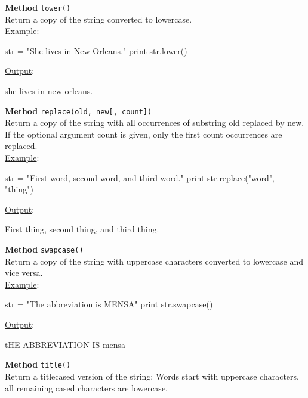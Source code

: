 \noindent
{\bf Method} {\tt lower()}\\

\noindent
Return a copy of the string converted to lowercase.\\

\noindent
\underline{Example}:
\begin{bluecode}
str = "She lives in New Orleans."
print str.lower()
\end{bluecode}
\underline{Output}:
\begin{bluecode}
she lives in new orleans.
\end{bluecode}
\vspace{4mm}

\noindent
{\bf Method} {\tt replace(old, new[, count])}\\

\noindent
Return a copy of the string with all occurrences of substring old replaced by new. 
If the optional argument count is given, only the first count occurrences are replaced.\\

\noindent
\underline{Example}:
\begin{bluecode}
str = "First word, second word, and third word."
print str.replace("word", "thing")
\end{bluecode}
\underline{Output}:
\begin{bluecode}
First thing, second thing, and third thing.
\end{bluecode}
\vspace{4mm}

\noindent
{\bf Method} {\tt swapcase()}\\

\noindent
Return a copy of the string with uppercase characters converted to lowercase and vice versa.\\

\noindent
\underline{Example}:
\begin{bluecode}
str = "The abbreviation is MENSA"
print str.swapcase()
\end{bluecode}
\underline{Output}:
\begin{bluecode}
tHE ABBREVIATION IS mensa
\end{bluecode}
\vspace{4mm}

\noindent
{\bf Method} {\tt title()}\\

\noindent
Return a titlecased version of the string: Words start with uppercase characters, 
all remaining cased characters are lowercase.\\

